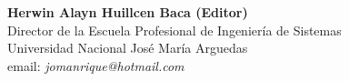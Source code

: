 \begin{center}
\textbf{Herwin Alayn Huillcen Baca (Editor)}\\
Director de la Escuela Profesional de Ingenierí­a de Sistemas \\
Universidad Nacional José Marí­a Arguedas \\
email: \textit{jomanrique@hotmail.com}\\
\end{center}

